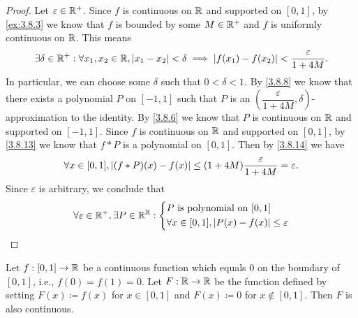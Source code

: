 \begin{proof}
  Let \(\varepsilon \in \mathbb{R}^+\).
  Since \(f\) is continuous on \(\mathbb{R}\) and supported on \([0, 1]\), by \cref{ex:3.8.3} we know that \(f\) is bounded by some \(M \in \mathbb{R}^+\) and \(f\) is uniformly continuous on \(\mathbb{R}\).
  This means
  \[
    \exists \delta \in \mathbb{R}^+ : \forall x_1, x_2 \in \mathbb{R}, \left\lvert x_1 - x_2\right\rvert < \delta \implies \left\lvert f(x_1) - f(x_2)\right\rvert < \dfrac{\varepsilon}{1 + 4M}.
  \]
  In particular, we can choose some \(\delta\) such that \(0 < \delta < 1\).
  By \cref{3.8.8} we know that there exists a polynomial \(P\) on \([-1, 1]\) such that \(P\) is an \((\dfrac{\varepsilon}{1 + 4M}, \delta)\)-approximation to the identity.
  By \cref{3.8.6} we know that \(P\) is continuous on \(\mathbb{R}\) and supported on \([-1, 1]\).
  Since \(f\) is continuous on \(\mathbb{R}\) and supported on \([0, 1]\), by \cref{3.8.13} we know that \(f * P\) is a polynomial on \([0, 1]\).
  Then by \cref{3.8.14} we have
  \[
    \forall x \in [0, 1], \left\lvert(f * P)(x) - f(x)\right\rvert \leq (1 + 4M) \dfrac{\varepsilon}{1 + 4M} = \varepsilon.
  \]
  Since \(\varepsilon\) is arbitrary, we conclude that
  \[
    \forall \varepsilon \in \mathbb{R}^+, \exists P \in \mathbb{R}^{\mathbb{R}} : \begin{dcases}
      P \text{ is polynomial on } [0, 1] \\
      \forall x \in [0, 1], \left\lvert P(x) - f(x)\right\rvert \leq \varepsilon
    \end{dcases}
  \]
\end{proof}

\begin{lem}\label{3.8.16}
  Let \(f : [0, 1] \to \mathbb{R}\) be a continuous function which equals \(0\) on the boundary of \([0, 1]\), i.e., \(f(0) = f(1) = 0\).
  Let \(F : \mathbb{R} \to \mathbb{R}\) be the function defined by setting \(F(x) \coloneqq f(x)\) for \(x \in [0, 1]\) and \(F(x) \coloneqq 0\) for \(x \notin [0, 1]\).
  Then \(F\) is also continuous.
\end{lem}

